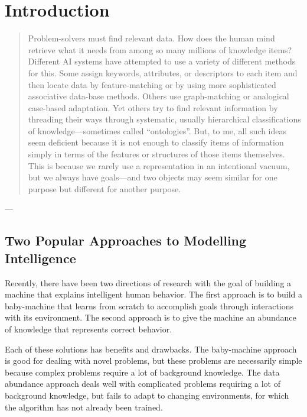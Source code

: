 \chapter{Introduction}\label{ch:introduction}

\begin{quote}
Problem-solvers must find relevant data.  How does the human mind
retrieve what it needs from among so many millions of knowledge items?
Different AI systems have attempted to use a variety of different
methods for this.  Some assign keywords, attributes, or descriptors to
each item and then locate data by feature-matching or by using more
sophisticated associative data-base methods.  Others use
graph-matching or analogical case-based adaptation.  Yet others try to
find relevant information by threading their ways through systematic,
usually hierarchical classifications of knowledge---sometimes called
``ontologies''.  But, to me, all such ideas seem deficient because it
is not enough to classify items of information simply in terms of the
features or structures of those items themselves.  This is because we
rarely use a representation in an intentional vacuum, but we always
have goals---and two objects may seem similar for one purpose but
different for another purpose.
\end{quote}
\begin{flushright}
 ---  \citep{minsky:1991}
\end{flushright}

\section{Two Popular Approaches to Modelling Intelligence}

Recently, there have been two directions of research with the goal of
building a machine that explains intelligent human behavior.  The
first approach is to build a baby-machine that learns from scratch to
accomplish goals through interactions with its environment.  The
second approach is to give the machine an abundance of knowledge that
represents correct behavior.

Each of these solutions has benefits and drawbacks.  The baby-machine
approach is good for dealing with novel problems, but these problems
are necessarily simple because complex problems require a lot of
background knowledge.  The data abundance approach deals well with
complicated problems requiring a lot of background knowledge, but
fails to adapt to changing environments, for which the algorithm has
not already been trained.

